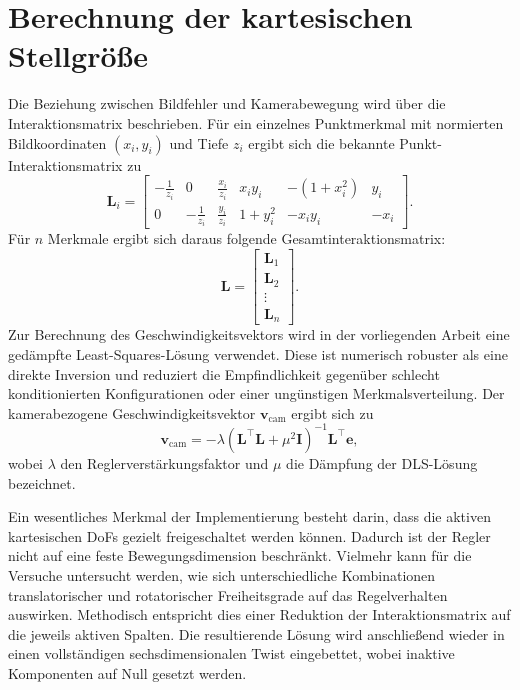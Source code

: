 \section{Berechnung der kartesischen Stellgröße}
\label{sec:berechnung_stellgroesse}

Die Beziehung zwischen Bildfehler und Kamerabewegung wird über die Interaktionsmatrix beschrieben. Für ein einzelnes Punktmerkmal mit normierten Bildkoordinaten \((x_i,y_i)\) und Tiefe \(z_i\) ergibt sich die bekannte Punkt-Interaktionsmatrix zu
\begin{equation}
\mathbf{L}_i =
\begin{bmatrix}
-\frac{1}{z_i} & 0 & \frac{x_i}{z_i} & x_i y_i & -(1+x_i^2) & y_i \\
0 & -\frac{1}{z_i} & \frac{y_i}{z_i} & 1+y_i^2 & -x_i y_i & -x_i
\end{bmatrix}.
\end{equation}
Für \(n\) Merkmale ergibt sich daraus folgende Gesamtinteraktionsmatrix:
\begin{equation}
\mathbf{L} =
\begin{bmatrix}
\mathbf{L}_1 \\
\mathbf{L}_2 \\
\vdots \\
\mathbf{L}_n
\end{bmatrix}.
\end{equation}
Zur Berechnung des Geschwindigkeitsvektors wird in der vorliegenden Arbeit eine gedämpfte Least-Squares-Lösung verwendet. Diese ist numerisch robuster als eine direkte Inversion und reduziert die Empfindlichkeit gegenüber schlecht konditionierten Konfigurationen oder einer ungünstigen Merkmalsverteilung. Der kamerabezogene Geschwindigkeitsvektor \(\mathbf{v}_{\mathrm{cam}}\) ergibt sich zu
\begin{equation}
\mathbf{v}_{\mathrm{cam}}
=
-\lambda
\left(
\mathbf{L}^{\top}\mathbf{L} + \mu^2 \mathbf{I}
\right)^{-1}
\mathbf{L}^{\top}\mathbf{e},
\end{equation}
wobei \(\lambda\) den Reglerverstärkungsfaktor und \(\mu\) die Dämpfung der \ac{DLS}-Lösung bezeichnet.

Ein wesentliches Merkmal der Implementierung besteht darin, dass die aktiven kartesischen \acp{DoF} gezielt freigeschaltet werden können. Dadurch ist der Regler nicht auf eine feste Bewegungsdimension beschränkt. Vielmehr kann für die Versuche untersucht werden, wie sich unterschiedliche Kombinationen translatorischer und rotatorischer Freiheitsgrade auf das Regelverhalten auswirken. Methodisch entspricht dies einer Reduktion der Interaktionsmatrix auf die jeweils aktiven Spalten. Die resultierende Lösung wird anschließend wieder in einen vollständigen sechsdimensionalen Twist eingebettet, wobei inaktive Komponenten auf Null gesetzt werden.

